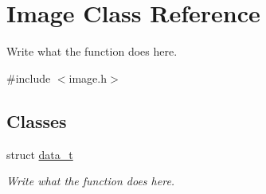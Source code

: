 \hypertarget{classImage}{\section{Image Class Reference}
\label{classImage}
}


Write what the function does here.  




{\ttfamily \#include $<$image.\+h$>$}

\subsection*{Classes}
\begin{DoxyCompactItemize}
\item 
struct \hyperlink{structImage_1_1data__t}{data\+\_\+t}
\begin{DoxyCompactList}\small\item\em Write what the function does here. \end{DoxyCompactList}\end{DoxyCompactItemize}
